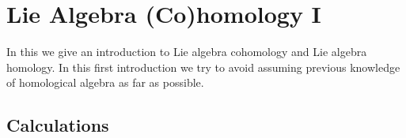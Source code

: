 \chapter{Lie Algebra (Co)homology I}
\label{lie algebra cohomology}


\begin{fluff}
  In this  we give an introduction to Lie algebra cohomology and Lie algebra homology.
  In this first introduction we try to avoid assuming previous knowledge of homological algebra as far as possible.
\end{fluff}





\section{Calculations}

